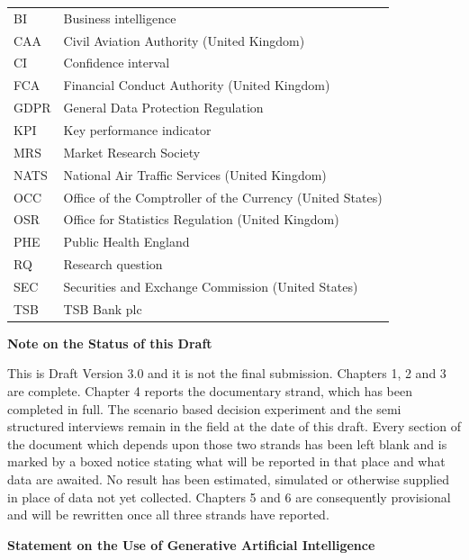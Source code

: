 \documentclass[12pt,a4paper]{article}
\begin{document}
{
\begin{tabular}{@{}p{2.6cm} p{11.5cm}@{}}
BI & Business intelligence \\
CAA & Civil Aviation Authority (United Kingdom) \\
CI & Confidence interval \\
FCA & Financial Conduct Authority (United Kingdom) \\
GDPR & General Data Protection Regulation \\
KPI & Key performance indicator \\
MRS & Market Research Society \\
NATS & National Air Traffic Services (United Kingdom) \\
OCC & Office of the Comptroller of the Currency (United States) \\
OSR & Office for Statistics Regulation (United Kingdom) \\
PHE & Public Health England \\
RQ & Research question \\
SEC & Securities and Exchange Commission (United States) \\
TSB & TSB Bank plc \\
\end{tabular}
\par}

\vspace{22pt}
\begin{center}{\large\bfseries Note on the Status of this Draft}\end{center}
\vspace{10pt}

This is Draft Version 3.0 and it is not the final submission. Chapters 1, 2 and 3 are complete. Chapter 4
reports the documentary strand, which has been completed in full. The scenario based decision experiment
and the semi structured interviews remain in the field at the date of this draft. Every section of the
document which depends upon those two strands has been left blank and is marked by a boxed notice stating
what will be reported in that place and what data are awaited. No result has been estimated, simulated or
otherwise supplied in place of data not yet collected. Chapters 5 and 6 are consequently provisional and
will be rewritten once all three strands have reported.

\vspace{10pt}
\begin{center}{\large\bfseries Statement on the Use of Generative Artificial Intelligence}\end{center}
\vspace{10pt}
\end{document}
